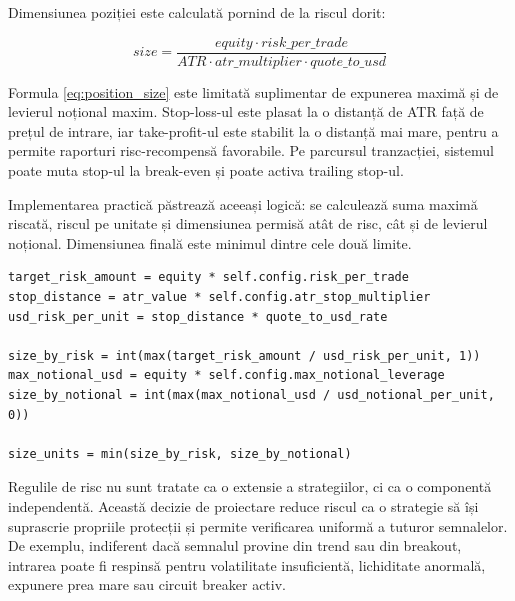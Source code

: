 Dimensiunea poziției este calculată pornind de la riscul dorit:

\begin{equation}
    \label{eq:position_size}
    size = \frac{equity \cdot risk\_per\_trade}{ATR \cdot atr\_multiplier \cdot quote\_to\_usd}
\end{equation}

Formula \eqref{eq:position_size} este limitată suplimentar de expunerea maximă și de levierul noțional maxim. Stop-loss-ul este plasat la o distanță de ATR față de prețul de intrare, iar take-profit-ul este stabilit la o distanță mai mare, pentru a permite raporturi risc-recompensă favorabile. Pe parcursul tranzacției, sistemul poate muta stop-ul la break-even și poate activa trailing stop-ul.

Implementarea practică păstrează aceeași logică: se calculează suma maximă riscată, riscul pe unitate și dimensiunea permisă atât de risc, cât și de levierul noțional. Dimensiunea finală este minimul dintre cele două limite.

\begin{code}
\begin{verbatim}
target_risk_amount = equity * self.config.risk_per_trade
stop_distance = atr_value * self.config.atr_stop_multiplier
usd_risk_per_unit = stop_distance * quote_to_usd_rate

size_by_risk = int(max(target_risk_amount / usd_risk_per_unit, 1))
max_notional_usd = equity * self.config.max_notional_leverage
size_by_notional = int(max(max_notional_usd / usd_notional_per_unit, 0))

size_units = min(size_by_risk, size_by_notional)
\end{verbatim}
\caption{Dimensionarea poziției în funcție de risc și volatilitate}
\label{code:position_size_risc}
\end{code}

Regulile de risc nu sunt tratate ca o extensie a strategiilor, ci ca o componentă independentă. Această decizie de proiectare reduce riscul ca o strategie să își suprascrie propriile protecții și permite verificarea uniformă a tuturor semnalelor. De exemplu, indiferent dacă semnalul provine din trend sau din breakout, intrarea poate fi respinsă pentru volatilitate insuficientă, lichiditate anormală, expunere prea mare sau circuit breaker activ.


